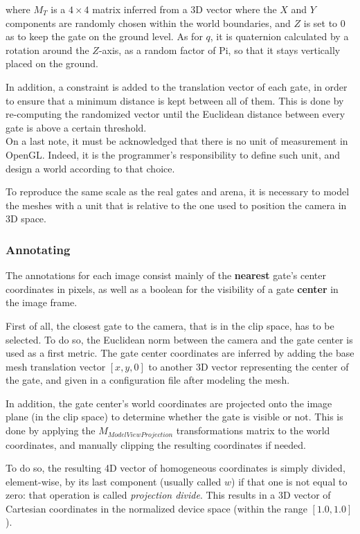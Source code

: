 where $M_T$ is a $4 \times 4$ matrix inferred from a 3D vector where the $X$
and $Y$ components are randomly chosen within the world boundaries, and $Z$ is
set to 0 as to keep the gate on the ground level. As for $q$, it is quaternion
calculated by a rotation around the $Z$-axis, as a random factor of Pi, so that
it stays vertically placed on the ground.

In addition, a constraint is added to the translation vector of each gate, in
order to ensure that a minimum distance is kept between all of them. This is
done by re-computing the randomized vector until the Euclidean distance between
every gate is above a certain threshold.\\

On a last note, it must be acknowledged that there is no unit of measurement in
OpenGL. Indeed, it is the programmer's responsibility to define such unit, and
design a world according to that choice.

To reproduce the same scale as the real gates and arena, it is necessary to
model the meshes with a unit that is relative to the one used to position the
camera in 3D space.

	\subsubsection{Annotating}

The annotations for each image consist mainly of the \textbf{nearest}
gate's center coordinates in pixels, as well as a boolean for the
visibility of a gate \textbf{center} in the image frame.

First of all, the closest gate to the camera, that is in the clip space, has to
be selected. To do so, the Euclidean norm between the camera and the gate
center is used as a first metric. The gate center coordinates are inferred by
adding the base mesh translation vector $[x, y, 0]$ to another 3D vector
representing the center of the gate, and given in a configuration file after
modeling the mesh.

In addition, the gate center's world coordinates are projected onto the image
plane (in the clip space) to determine whether the gate is visible or not. This
is done by applying the $M_{ModelViewProjection}$ transformations matrix to the
world coordinates, and manually clipping the resulting coordinates if needed.


To do so, the resulting 4D vector of homogeneous coordinates is simply divided,
element-wise, by its last component (usually called $w$) if that one is not
equal to zero: that operation is called \emph{projection divide}. This results
in a 3D vector of Cartesian coordinates in the normalized device space (within
the range $[1.0, 1.0]$).

